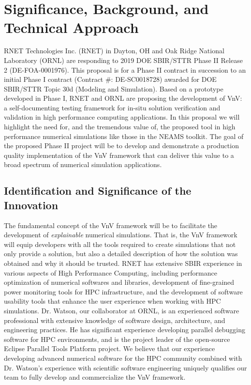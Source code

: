 \section{Significance, Background, and Technical Approach}

RNET Technologies Inc. (RNET) in Dayton, OH and Oak Ridge National Laboratory 
(ORNL) are responding to 2019 DOE SBIR/STTR Phase II Release 2 
(DE-FOA-0001976). This proposal is for a Phase II contract in succession to an 
initial Phase I contract (Contract \#: DE-SC0018728) awarded for DOE 
SBIR/STTR Topic 30d (Modeling and Simulation). Based on a prototype developed in Phase I, RNET and ORNL are proposing the development of VnV: a self-documenting 
testing framework for in-situ solution verification and validation in high performance computing applications. In this proposal we will highlight the need for, and the tremendous value of, the proposed tool in high performance numerical simulations like those in the NEAMS toolkit. The goal of the proposed Phase II project will be to develop and demonstrate a production quality implementation of the VnV framework that can deliver this value to a broad spectrum of numerical simulation applications. 

\subsection{Identification and Significance of the Innovation}
\label{sec:identification}

The fundamental concept of the VnV framework will be to facilitate the development of \emph{explainable} numerical simulations. That is, the VnV framework will equip developers with all the tools required to create simulations that not only provide a solution, but also a detailed description of how the solution was obtained and why it should be trusted. RNET has extensive SBIR experience in various aspects of High Performance Computing, including performance optimization of numerical softwares and libraries, development of fine-grained power monitoring tools for HPC infrastructure, and the development of software usability tools that enhance the user experience when working with HPC simulations. Dr. Watson, our collaborator at ORNL, is an experienced software professional with extensive knowledge of software design, architecture, and engineering practices. He has significant experience developing parallel debugging software for HPC environments, and  is the project leader of the open-source Eclipse Parallel Tools Platform project. We believe that our experience developing advanced numerical software for the HPC community combined with Dr. Watson's experience with scientific software engineering uniquely qualifies our team to fully develop and commercialize the VnV framework.


